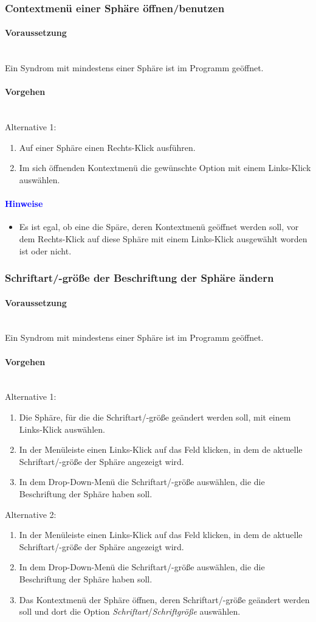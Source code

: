 \documentclass[enabledeprecatedfontcommands,fontsize=11pt,paper=a4,twoside]{scrartcl}
\newcommand*{\hint}{\paragraph{\textcolor{blue}{Hinweise}}}
\newcommand*{\condition}{\paragraph{Voraussetzung}$\;$ \vspace{0.2cm}\\}
\newcommand*{\actions}{\paragraph{Vorgehen} $\;$\vspace{0.2cm}\\}
\begin{document}
		\subsubsection{Contextmenü einer Sphäre öffnen/benutzen}
				\condition 	
		Ein Syndrom mit mindestens einer Sphäre ist im Programm geöffnet. 
		\actions  
		Alternative 1:
		\begin{enumerate}
			\item Auf einer Sphäre einen Rechts-Klick ausführen.
			\item Im sich öffnenden Kontextmenü die gewünschte Option mit einem Links-Klick auswählen.
		\end{enumerate}
		\hint
		\begin{itemize}
			\item Es ist egal, ob eine die Späre, deren Kontextmenü geöffnet werden soll, vor dem Rechts-Klick auf diese Sphäre mit einem Links-Klick ausgewählt worden ist oder nicht.
		\end{itemize}
		
				\newpage	
		\subsubsection{Schriftart/-größe der Beschriftung der Sphäre ändern}
				\condition 	
		Ein Syndrom mit mindestens einer Sphäre ist im Programm geöffnet. 
		\actions  
		Alternative 1:
		\begin{enumerate}
			\item Die Sphäre, für die die Schriftart/-größe geändert werden soll, mit einem Links-Klick auswählen.
			\item In der Menüleiste einen Links-Klick auf das Feld klicken, in dem de aktuelle Schriftart/-größe der Sphäre angezeigt wird.
			\item In dem Drop-Down-Menü die Schriftart/-größe auswählen, die die Beschriftung der Sphäre haben soll.
		\end{enumerate}
		Alternative 2:
			\begin{enumerate}
			\item In der Menüleiste einen Links-Klick auf das Feld klicken, in dem de aktuelle Schriftart/-größe der Sphäre angezeigt wird.
			\item In dem Drop-Down-Menü die Schriftart/-größe auswählen, die die Beschriftung der Sphäre haben soll.
			\item Das Kontextmenü der Sphäre öffnen, deren Schriftart/-größe geändert werden soll und dort die Option \textit{Schriftart}/\textit{Schriftgröße} auswählen.
		\end{enumerate}
		
\end{document}
